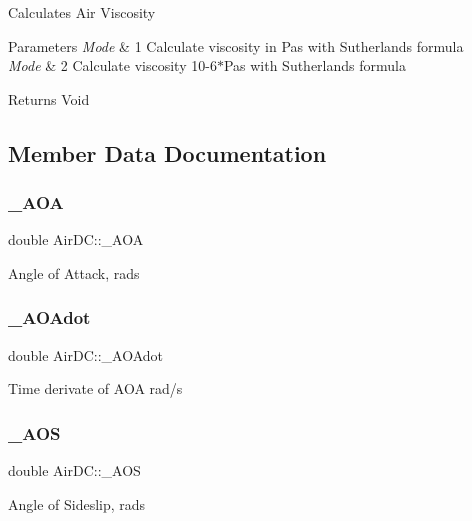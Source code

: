 Calculates Air Viscosity 
\begin{DoxyParams}{Parameters}
{\em Mode} & 1 Calculate viscosity in Pas with Sutherland\textquotesingle{}s formula \\
\hline
{\em Mode} & 2 Calculate viscosity 10-\/6$\ast$\+Pas with Sutherland\textquotesingle{}s formula \\
\hline
\end{DoxyParams}
\begin{DoxyReturn}{Returns}
Void 
\end{DoxyReturn}


\subsection{Member Data Documentation}
\mbox{\label{class_air_d_c_acffb07b44db4ac59865794b08166c076}} 
\subsubsection{\texorpdfstring{\+\_\+\+A\+OA}{\_AOA}}
{\footnotesize\ttfamily double Air\+D\+C\+::\+\_\+\+A\+OA}

Angle of Attack, rads \mbox{\label{class_air_d_c_a70fe35edba2791df773ca1a8d7443d2b}} 
\subsubsection{\texorpdfstring{\+\_\+\+A\+O\+Adot}{\_AOAdot}}
{\footnotesize\ttfamily double Air\+D\+C\+::\+\_\+\+A\+O\+Adot}

Time derivate of A\+OA rad/s \mbox{\label{class_air_d_c_a7a5ce65539837a96aea6ab27cc17805d}} 
\subsubsection{\texorpdfstring{\+\_\+\+A\+OS}{\_AOS}}
{\footnotesize\ttfamily double Air\+D\+C\+::\+\_\+\+A\+OS}

Angle of Sideslip, rads \mbox{\label{class_air_d_c_abd2d478d783886d15f87b99534fcaf62}} 
